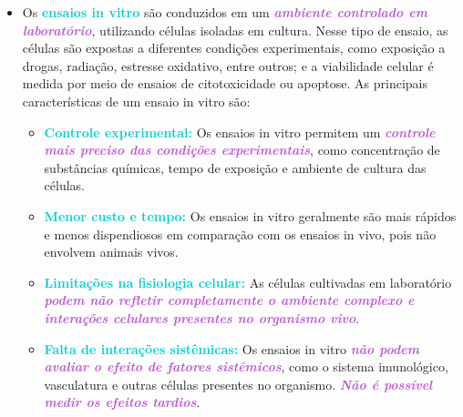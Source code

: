 \documentclass[11pt,a4paper]{article}
\begin{document}
	\begin{itemize}[label=\textcolor{CarnationPink}{$\blacktriangleright$}]
		\item Os \textcolor{DarkTurquoise}{\LobsterTwo\textbf{ensaios in vitro}} são conduzidos em um \textcolor{MediumOrchid}{\textbf{\textit{ambiente controlado em laboratório}}}, utilizando células isoladas em cultura. Nesse tipo de ensaio, as células são expostas a diferentes condições experimentais, como exposição a drogas, radiação, estresse oxidativo, entre outros; e a viabilidade celular é medida por meio de ensaios de citotoxicidade ou apoptose. As principais características de um ensaio in vitro são:
		
		\begin{itemize}[label=\textcolor{CarnationPink}{$\star$}]
			\item \textcolor{DarkTurquoise}{\textbf{Controle experimental:}} Os ensaios in vitro permitem um \textcolor{MediumOrchid}{\textbf{\textit{controle mais preciso das condições experimentais}}}, como concentração de substâncias químicas, tempo de exposição e ambiente de cultura das células.
			\item \textcolor{DarkTurquoise}{\textbf{Menor custo e tempo:}} Os ensaios in vitro geralmente são mais rápidos e menos dispendiosos em comparação com os ensaios in vivo, pois não envolvem animais vivos.
			\item \textcolor{DarkTurquoise}{\textbf{Limitações na fisiologia celular:}} As células cultivadas em laboratório \textcolor{MediumOrchid}{\textbf{\textit{podem não refletir completamente o ambiente complexo e interações celulares presentes no organismo vivo}}}.
			\item \textcolor{DarkTurquoise}{\textbf{Falta de interações sistêmicas:}} Os ensaios in vitro \textcolor{MediumOrchid}{\textbf{\textit{não podem avaliar o efeito de fatores sistêmicos}}}, como o sistema imunológico, vasculatura e outras células presentes no organismo. \textcolor{MediumOrchid}{\textbf{\textit{Não é possível medir os efeitos tardios}}}.
		\end{itemize}
		

\end{itemize}
\end{document}
